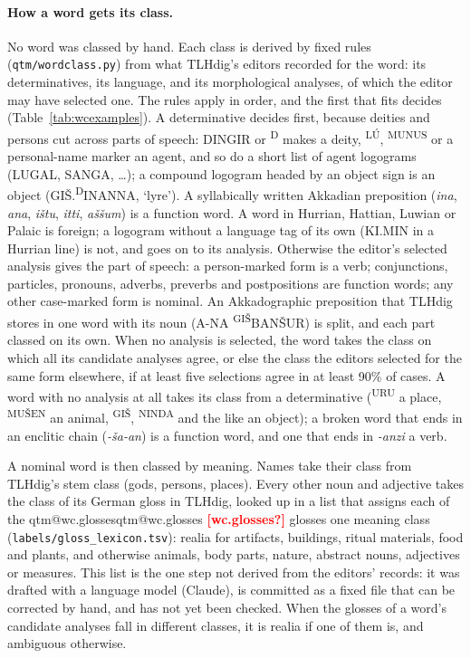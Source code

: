 \documentclass{ceurart}
\makeatletter
\newcommand{\Q}[1]{\ifcsname qtm@#1\endcsname\csname qtm@#1\endcsname\else
  \textbf{\textcolor{red}{[#1?]}}\PackageWarning{qtm}{Undefined number #1}\fi}
\makeatother
\begin{document}
\paragraph{How a word gets its class.}
No word was classed by hand. Each class is derived by fixed rules (\texttt{qtm/wordclass.py}) from
what TLHdig's editors recorded for the word: its determinatives, its language, and its
morphological analyses, of which the editor may have selected one. The rules apply in order, and
the first that fits decides (Table~\ref{tab:wcexamples}). A determinative decides first, because
deities and persons cut across parts of speech: DINGIR or \textsuperscript{D} makes a deity,
\textsuperscript{LÚ}, \textsuperscript{MUNUS} or a personal-name marker an agent, and so do a short
list of agent logograms (LUGAL, SANGA, \dots); a compound logogram headed by an object sign is an
object (GIŠ.\textsuperscript{D}INANNA, `lyre'). A syllabically written Akkadian preposition
(\textit{ina}, \textit{ana}, \textit{ištu}, \textit{itti}, \textit{aššum}) is a function word. A word
in Hurrian, Hattian, Luwian or Palaic is foreign; a logogram without a language tag of its own
(KI.MIN in a Hurrian line) is not, and goes on to its analysis. Otherwise the editor's selected
analysis gives the part of speech: a person-marked form is a verb; conjunctions, particles,
pronouns, adverbs, preverbs and postpositions are function words; any other case-marked form is
nominal. An Akkadographic preposition that TLHdig stores in one word with its noun (A-NA
\textsuperscript{GIŠ}BANŠUR) is split, and each part classed on its own. When no analysis is
selected, the word takes the class on which all its candidate analyses agree, or else the class
the editors selected for the same form elsewhere, if at least five selections agree in at least
90\% of cases. A word with no analysis at all takes its class from a determinative
(\textsuperscript{URU} a place, \textsuperscript{MUŠEN} an animal, \textsuperscript{GIŠ},
\textsuperscript{NINDA} and the like an object); a broken word that ends in an enclitic chain
(\textit{-ša-an}) is a function word, and one that ends in \textit{-anzi} a verb.

A nominal word is then classed by meaning. Names take their class from TLHdig's stem class (gods,
persons, places). Every other noun and adjective takes the class of its German gloss in TLHdig,
looked up in a list that assigns each of the \Q{wc.glosses} glosses one meaning class
(\texttt{labels/gloss\_lexicon.tsv}): realia for artifacts, buildings, ritual materials, food and
plants, and otherwise animals, body parts, nature, abstract nouns, adjectives or measures. This
list is the one step not derived from the editors' records: it was drafted with a language model
(Claude), is committed as a fixed file that can be corrected by hand, and has not yet been checked.
When the glosses of a word's candidate analyses fall in different classes, it is realia if one of
them is, and ambiguous otherwise.
\end{document}
